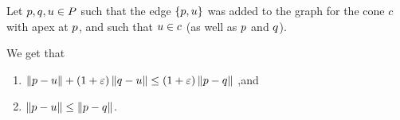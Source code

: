 \documentclass[12pt]{article}%
\begin{document}
\begin{lemma}
    Let $p,q,u\in P$ such that the edge $\{p, u\}$ was
    added to the graph for the cone $c$ with apex at $p$, and such
    that $u\in c$ (as well as $p$ and $q$).

    We get that
    \begin{enumerate}
        \item { $ \dY{\pa}{\pc}%
           +%
           (1+\eps)\dY{\pb}{\pc}%
           \leq%
           (1+\eps)\dY{\pa}{\pb}%
           $ ,and }
        \item { $ \dY{\pa}{\pc}%
           \leq%
           \dY{\pa}{\pb}%
           $.  }
    \end{enumerate}



\end{lemma}
\end{document}
